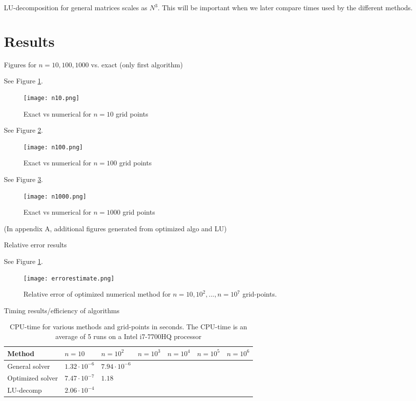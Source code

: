 \documentclass[12pt]{article}
\numberwithin{equation}{section}     %
\begin{document}
LU-decomposition for general matrices scales as $N^3$. This will be important when we later compare times used by the different methods.



\newpage
\section{Results}

Figures for $n=10, 100, 1000$ vs. exact (only first algorithm)

See Figure \ref{fig:fig1}.
\begin{figure}[H]
\begin{center}
\texttt{[image: n10.png]}
\end{center}
\caption{Exact vs numerical for $n=10$ grid points}
\label{fig:fig1}
\end{figure}

See Figure \ref{fig:fig2}.
\begin{figure}[H]
\begin{center}
\texttt{[image: n100.png]}
\end{center}
\caption{Exact vs numerical for $n=100$ grid points}
\label{fig:fig2}
\end{figure}

See Figure \ref{fig:fig3}.
\begin{figure}[H]
\begin{center}
\texttt{[image: n1000.png]}
\end{center}
\caption{Exact vs numerical for $n=1000$ grid points}
\label{fig:fig3}
\end{figure}

(In appendix A, additional figures generated from optimized algo and LU)

Relative error results

See Figure \ref{fig:relerror}.
\begin{figure}[H]
\begin{center}
\texttt{[image: errorestimate.png]}
\end{center}
\caption{Relative error of optimized numerical method for $n = 10, 10^2, ...,n=10^7$ grid-points.}
\label{fig:relerror}
\end{figure}

Timing results/efficiency of algorithms

\begin{table}[]
\begin{tabular}{|l|l|l|l|l|l|l|}
\hline
 Method&        $n=10$&  $n=10^2$&  $n=10^3$&  $n=10^4$&  $n=10^5$&  $n=10^6$\\ \hline
 General solver& $1.32 \cdot 10^{-6}$ & $7.94\cdot 10^{-6}$ &  &  &  &  \\ \hline
 Optimized solver& $7.47 \cdot 10^{-7}$ & $1.18$ &  &  &  &  \\ \hline
 LU-decomp& $2.06 \cdot 10^{-4}$&  &  &  &  &  \\ \hline
\end{tabular}
\caption{CPU-time for various methods and grid-points in seconds. The CPU-time is an average of 5 runs on a Intel i7-7700HQ processor}
\label{fig:relerror}
\end{table}
\end{document}
